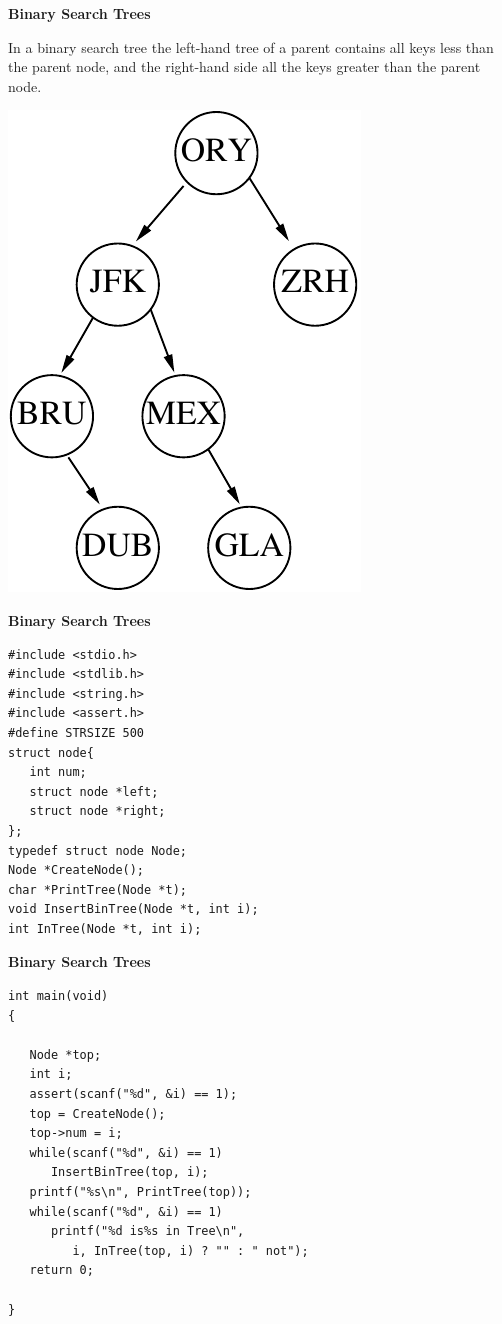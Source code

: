\documentclass[a4,portraitt]{slides}
\begin{document}
\newpage
{\samepage
\begin{center}
{\Large{\bf Binary Search Trees}}
\end{center}
In a binary search tree the left-hand tree of a parent contains all keys less than the parent node,
and the right-hand side all the keys greater than the parent node.
\begin{center}
\includegraphics{../Images/treeapt.pdf}
\end{center}
}

\newpage
{\samepage
\begin{center}
{\Large{\bf Binary Search Trees}}
\end{center}
\begin{verbatim}
#include <stdio.h>
#include <stdlib.h>
#include <string.h>
#include <assert.h>
#define STRSIZE 500
struct node{
   int num;
   struct node *left;
   struct node *right;
};
typedef struct node Node;
Node *CreateNode();
char *PrintTree(Node *t);
void InsertBinTree(Node *t, int i);
int InTree(Node *t, int i);
\end{verbatim}
}

\newpage
{\samepage
\begin{center}
{\Large{\bf Binary Search Trees}}
\end{center}
\begin{verbatim}
int main(void)
{

   Node *top;
   int i;
   assert(scanf("%d", &i) == 1);
   top = CreateNode();
   top->num = i;
   while(scanf("%d", &i) == 1)
      InsertBinTree(top, i);
   printf("%s\n", PrintTree(top));
   while(scanf("%d", &i) == 1)
      printf("%d is%s in Tree\n",
         i, InTree(top, i) ? "" : " not");
   return 0;

}
\end{verbatim}
}
\end{document}
